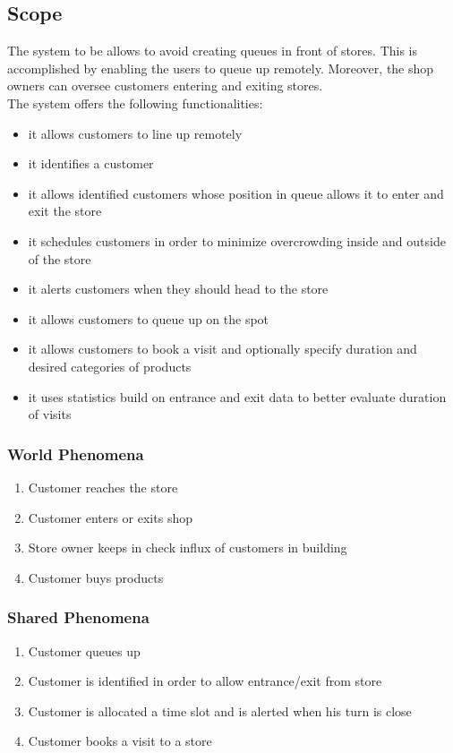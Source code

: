 \subsection{Scope}
The system to be allows to avoid creating queues in front of stores.
This is accomplished by enabling the users to queue up remotely.
Moreover, the shop owners can oversee customers entering and exiting stores. \\
The system offers the following functionalities:
\begin{itemize}
	\item it allows customers to line up remotely
	\item it identifies a customer
	\item it allows identified customers whose position in queue allows it to enter and exit the store
	\item it schedules customers in order to minimize overcrowding inside and outside of the store
	\item it alerts customers when they should head to the store
	\item it allows customers to queue up on the spot
	\item it allows customers to book a visit and optionally specify duration and desired categories of products
	\item it uses statistics build on entrance and exit data to better evaluate duration of visits
\end{itemize}
\subsubsection{World Phenomena}
\begin{enumerate}
	\item Customer reaches the store
	\item Customer enters or exits shop
	\item Store owner keeps in check influx of customers in building
	\item Customer buys products
\end{enumerate}
\subsubsection{Shared Phenomena}
\begin{enumerate}
	\item Customer queues up
	\item Customer is identified in order to allow entrance/exit from store
	\item Customer is allocated a time slot and is alerted when his turn is close
	\item Customer books a visit to a store
\end{enumerate}


